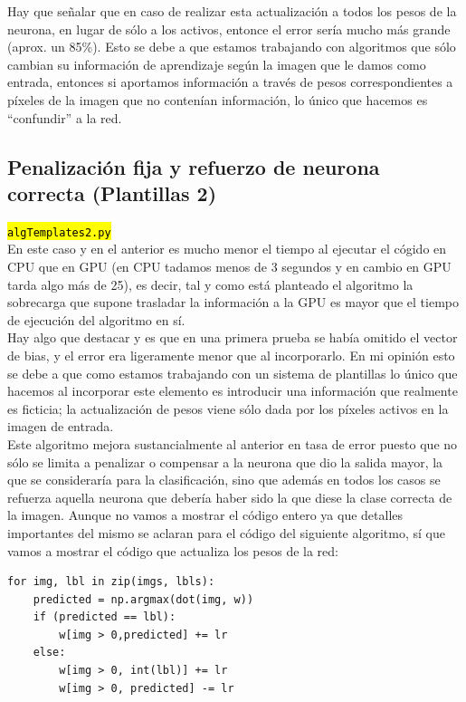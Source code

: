 \documentclass[10pt,a4paper]{article}
\newcommand{\archive}[1]{\sethlcolor{light-green}\hl{\texttt{#1}}} %
\begin{document}
Hay que señalar que en caso de realizar esta actualización a todos los pesos de la neurona, en lugar de sólo a los activos, entonce el error sería mucho más grande (aprox. un 85\%). Esto se debe a que estamos trabajando con algoritmos que sólo cambian su información de aprendizaje según la imagen que le damos como entrada, entonces si aportamos información a través de pesos correspondientes a píxeles de la imagen que no contenían información, lo único que hacemos es ``confundir'' a la red.

\subsection{Penalización fija y refuerzo de neurona correcta (Plantillas 2)}
\archive{algTemplates2.py}\\

En este caso y en el anterior es mucho menor el tiempo al ejecutar el cógido en CPU que en GPU (en CPU tadamos menos de 3 segundos y en cambio en GPU tarda algo más de 25), es decir, tal y como está planteado el algoritmo la sobrecarga que supone trasladar la información a la GPU es mayor que el tiempo de ejecución del algoritmo en sí.\\

Hay algo que destacar y es que en una primera prueba se había omitido el vector de bias, y el error era ligeramente menor que al incorporarlo. En mi opinión esto se debe a que como estamos trabajando con un sistema de plantillas lo único que hacemos al incorporar este elemento es introducir una información que realmente es ficticia; la actualización de pesos viene sólo dada por los píxeles activos en la imagen de entrada.\\

Este algoritmo mejora sustancialmente al anterior en tasa de error puesto que no sólo se limita a penalizar o compensar a la neurona que dio la salida mayor, la que se consideraría para la clasificación, sino que además en todos los casos se refuerza aquella neurona que debería haber sido la que diese la clase correcta de la imagen. Aunque no vamos a mostrar el código entero ya que detalles importantes del mismo se aclaran para el código del siguiente algoritmo, sí que vamos a mostrar el código que actualiza los pesos de la red:

\begin{lstlisting}
for img, lbl in zip(imgs, lbls):
    predicted = np.argmax(dot(img, w))
    if (predicted == lbl):
        w[img > 0,predicted] += lr
    else:
        w[img > 0, int(lbl)] += lr
        w[img > 0, predicted] -= lr
\end{lstlisting}
\end{document}
